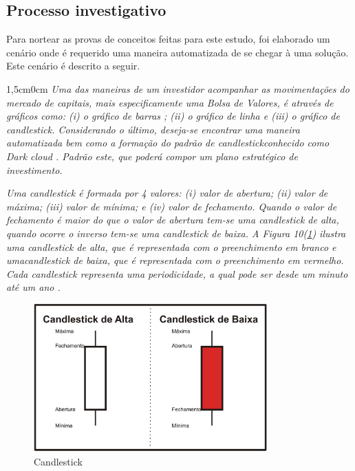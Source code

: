 \subsection{Processo investigativo}

Para nortear as provas de conceitos feitas para este estudo, foi elaborado um cenário onde é requerido uma maneira automatizada de se chegar à uma solução. Este cenário é descrito a seguir.

\begin{adjustwidth}{1,5cm}{0cm}
\textit{Uma das maneiras de um investidor acompanhar as movimentações do mercado de capitais, mais especificamente uma Bolsa de Valores, é através de gráficos como: (i) o gráfico de barras ; (ii) o gráfico de linha  e (iii) o gráfico de candlestick\cite[p. 5-6]{matsura2006}. Considerando o último, deseja-se encontrar uma maneira automatizada bem como a formação do padrão de candlestickconhecido como Dark cloud \cite[p.61]{matsura2006}. Padrão este, que poderá compor um plano estratégico de investimento.}

\textit{Uma candlestick é formada por 4 valores: (i) valor de abertura; (ii) valor de máxima; (iii) valor de mínima; e (iv) valor de fechamento. Quando o valor de  fechamento é maior do que o valor de abertura tem-se uma candlestick de alta, quando ocorre o inverso tem-se uma candlestick de baixa. A Figura 10(\ref{f10}) ilustra uma candlestick de alta, que é representada com o preenchimento em branco e umacandlestick de baixa, que é representada com o preenchimento em vermelho. Cada candlestick representa uma periodicidade, a qual pode ser desde um minuto até um ano \cite[p.6]{matsura2006}.}
\end{adjustwidth}

\begin{figure}[h]
\centering
\label{f10}
\includegraphics[width=0.8\textwidth]{figuras/f10}
\caption{Candlestick }

\end{figure}

